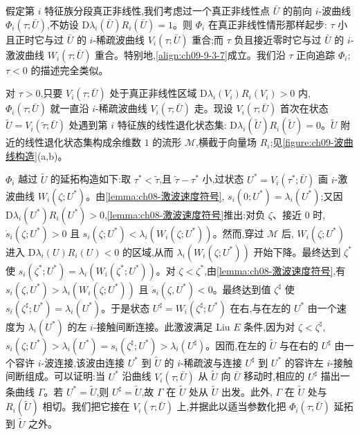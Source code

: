 \documentclass[../../main.tex]{subfiles}
\begin{document}
假定第 $i$ 特征族分段真正非线性,我们考虑过一个真正非线性点 $\bar{U}$ 的前向 $i$-波曲线 $\Phi_{i}(\tau;\bar{U})$,不妨设 $\mathrm{D}\lambda_{i}(\bar{U})R_{i}(\bar{U})=1$。则 $\Phi_{i}$ 在真正非线性情形那样起步: $\tau$ 小且正时它与过 $\bar{U}$ 的 $i$-稀疏波曲线 $V_{i}(\tau;\bar{U})$ 重合;而 $\tau$ 负且接近零时它与过 $\bar{U}$ 的 $i$-激波曲线 $W_{i}(\tau;\bar{U})$ 重合。特别地,\eqref{align:ch09-9-3-7}成立。我们沿 $\tau$ 正向追踪 $\Phi_{i}$; $\tau<0$ 的描述完全类似。

对 $\tau>0$,只要 $V_{i}(\tau;\bar{U})$ 处于真正非线性区域 $\mathrm{D}\lambda_{i}(V_{i})R_{i}(V_{i})>0$ 内, $\Phi_{i}(\tau;\bar{U})$ 就一直沿 $i$-稀疏波曲线 $V_{i}(\tau;\bar{U})$ 走。现设 $V_{i}(\tau;\bar{U})$ 首次在状态 $\tilde{U}=V_{i}(\tilde{\tau};\bar{U})$ 处遇到第 $i$ 特征族的线性退化状态集: $\mathrm{D}\lambda_{i}(\tilde{U})R_{i}(\tilde{U})=0$。$\tilde{U}$ 附近的线性退化状态集构成余维数 $1$ 的流形 $\mathscr{M}$,横截于向量场 $R_{i}$;见\cref{figure:ch09-波曲线构造}(a,b)。

$\Phi_{i}$ 越过 $\tilde{U}$ 的延拓构造如下:取 $\tau^{*}<\tilde{\tau}$,且 $\tilde{\tau}-\tau^{*}$ 小,过状态 $U^{*}=V_{i}(\tau^{*};\bar{U})$ 画 $i$-激波曲线 $W_{i}(\zeta;U^{*})$。由\cref{lemma:ch08-激波速度符号}, $s_{i}(0;U^{*})=\lambda_{i}(U^{*})$;又因 $\mathrm{D}\lambda_{i}(U^{*})R_{i}(U^{*})>0$,\cref{lemma:ch08-激波速度符号}推出:对负 $\zeta$、接近 $0$ 时, $\dot{s}_{i}(\zeta;U^{*})>0$ 且 $s_{i}(\zeta;U^{*})<\lambda_{i}(W_{i}(\zeta;U^{*}))$。然而,穿过 $\mathscr{M}$ 后, $W_{i}(\zeta;U^{*})$ 进入 $\mathrm{D}\lambda_{i}(U)R_{i}(U)<0$ 的区域,从而 $\lambda_{i}(W_{i}(\zeta;U^{*}))$ 开始下降。最终达到 $\zeta^{*}$ 使 $s_{i}(\zeta^{*};U^{*})=\lambda_{i}(W_{i}(\zeta^{*};U^{*}))$。对 $\zeta<\zeta^{*}$,由\cref{lemma:ch08-激波速度符号},有 $s_{i}(\zeta,U^{*})>\lambda_{i}(W_{i}(\zeta;U^{*}))$ 且 $\dot{s}_{i}(\zeta,U^{*})<0$。最终达到值 $\zeta^{\sharp}$ 使 $s_{i}(\zeta^{\sharp};U^{*})=\lambda_{i}(U^{*})$。于是状态 $U^{\sharp}=W_{i}(\zeta^{\sharp};U^{*})$ 在右,与在左的 $U^{*}$ 由一个速度为 $\lambda_{i}(U^{*})$ 的左 $i$-接触间断连接。此激波满足 Liu $E$ 条件,因为对 $\zeta<\zeta^{\sharp}$, $s_{i}(\zeta;U^{*})>\lambda_{i}(U^{*})=s_{i}(\zeta^{\sharp};U^{*})>\lambda_{i}(U^{\sharp})$。因而,在左的 $\tilde{U}$ 与在右的 $U^{\sharp}$ 由一个容许 $i$-波连接,该波由连接 $U^{*}$ 到 $\tilde{U}$ 的 $i$-稀疏波与连接 $U^{\sharp}$ 到 $U^{*}$ 的容许左 $i$-接触间断组成。可以证明:当 $U^{*}$ 沿曲线 $V_{i}(\tau;\bar{U})$ 从 $\tilde{U}$ 向 $\bar{U}$ 移动时,相应的 $U^{\sharp}$ 描出一条曲线 $\Gamma$。若 $U^{*}=\tilde{U}$,则 $U^{\sharp}=\tilde{U}$,故 $\Gamma$ 在 $\tilde{U}$ 处从 $\tilde{U}$ 出发。此外, $\Gamma$ 在 $\tilde{U}$ 处与 $R_{i}(\tilde{U})$ 相切。我们把它接在 $V_{i}(\tau;\bar{U})$ 上,并据此以适当参数化把 $\Phi_{i}(\tau;\bar{U})$ 延拓到 $\tilde{U}$ 之外。
\end{document}
